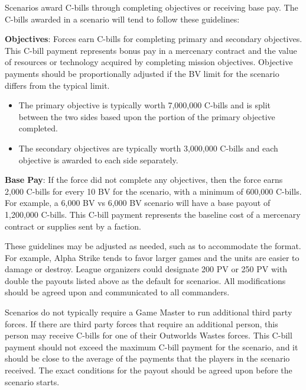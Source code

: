 Scenarios award C-bills through completing objectives or receiving base pay.
The C-bills awarded in a scenario will tend to follow these guidelines:

\begin{description}

\item {\bfseries Objectives}: Forces earn C-bills for completing primary and secondary objectives.
This C-bill payment represents bonus pay in a mercenary contract and the value of resources or technology acquired by completing mission objectives.
Objective payments should be proportionally adjusted if the BV limit for the scenario differs from the typical limit.

\begin{itemize}

\item The primary objective is typically worth 7,000,000 C-bills and is split between the two sides based upon the portion of the primary objective completed.

\item The secondary objectives are typically worth 3,000,000 C-bills and each objective is awarded to each side separately.

\end{itemize}

\item {\bfseries Base Pay}: If the force did not complete any objectives, then the force earns 2,000 C-bills for every 10 BV for the scenario, with a minimum of 600,000 C-bills.
For example, a 6,000 BV vs 6,000 BV scenario will have a base payout of 1,200,000 C-bills.
This C-bill payment represents the baseline cost of a mercenary contract or supplies sent by a faction.

\end{description}

These guidelines may be adjusted as needed, such as to accommodate the format.
For example, Alpha Strike tends to favor larger games and the units are easier to damage or destroy.
League organizers could designate 200 PV or 250 PV with double the payouts listed above as the default for scenarios.
All modifications should be agreed upon and communicated to all commanders.

Scenarios do not typically require a Game Master to run additional third party forces.
If there are third party forces that require an additional person, this person may receive C-bills for one of their Outworlds Wastes forces.
This C-bill payment should not exceed the maximum C-bill payment for the scenario, and it should be close to the average of the payments that the players in the scenario received.
The exact conditions for the payout should be agreed upon before the scenario starts.
